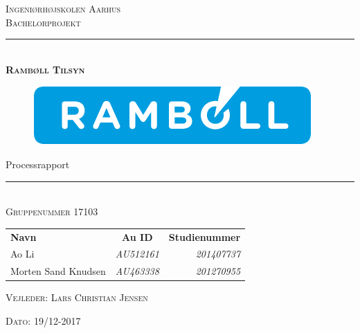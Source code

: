 \thispagestyle{empty}
\newcommand{\HRule}{\rule{\linewidth}{0.1mm}} %

\begin{center}
	\vspace{3cm}
	\textsc{\LARGE Ingeniørhøjskolen Aarhus}\\[1.5cm] %
	
	\textsc{\large Bachelorprojekt}\\[2.5cm] 
	
	\HRule \\[0.8cm]
	{\huge \bfseries \textsc{Rambøll Tilsyn}} 
	\begin{figure}[h!]
		\centering
		\includegraphics[width=0.7\linewidth]{Forside/Logo}
	\end{figure}

	{\LARGE Processrapport} \\[0.4cm]
	\HRule \\[1.5cm]
	

	
	\textsc{\large Gruppenummer 17103}\\
	\vspace{0.5 in}
	\begin{center}
		\begin{tabular}{l c r}
			\textbf{Navn} & \textbf{Au ID} & \textbf{Studienummer} \\
			Ao Li & \textsl{AU512161} & \textsl{201407737}    \\
			Morten Sand Knudsen & \textsl{AU463338} & \textsl{201270955}  \\
		\end{tabular}
	\end{center}
	\vspace{0.5 in}
	
	\textsc{\large Vejleder: Lars Christian Jensen}
	\vspace{0.5 in}
	
	\textsc{\large Dato: 19/12-2017}\\
	\vfill %
	
\end{center} %

\clearpage

\newpage